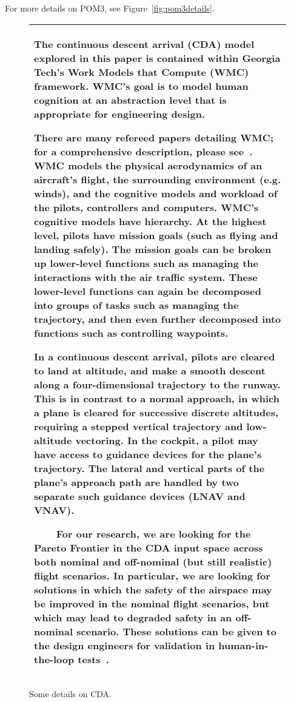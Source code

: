 \documentclass[10pt,journal,compsoc]{IEEEtran}
\newcommand{\fig}[1]{Figure~\ref{fig:#1}}
\begin{document}
For more details on POM3, see \fig{pom3details}.

\begin{figure}[!b]
\begin{center}\small
\begin{tabular}{|p{.95\linewidth}|}\hline
The continuous descent arrival (CDA) model explored in this paper is contained within Georgia Tech's Work Models that Compute (WMC) framework.
WMC's goal is to model human cognition at an abstraction level that is appropriate for engineering design.

There are many refereed papers detailing WMC; for a comprehensive description, please see~\cite{Kim2011,Pritchett2011,Feigh2012,Pritchett2013}.
WMC models the physical aerodynamics of an aircraft's flight, the surrounding environment (e.g. winds), and the cognitive models and workload of the pilots, controllers and computers.
WMC's cognitive models have hierarchy.
At the highest level, pilots have mission goals (such as flying and landing safely).
The mission goals can be broken up lower-level functions such as managing the interactions with the air traffic system.
These lower-level functions can again be decomposed into groups of tasks such as managing the trajectory, and then even further decomposed into functions such as controlling waypoints.

In a continuous descent arrival, pilots are cleared to land at altitude, and make a smooth descent along a four-dimensional trajectory to the runway.  
This is in contrast to a normal approach, in which a plane is cleared for successive discrete altitudes, requiring a stepped vertical trajectory and low-altitude vectoring.  
In the cockpit, a pilot may have access to guidance devices for the plane's trajectory.  
The lateral and vertical parts of the plane's approach path are handled by two separate such guidance devices (LNAV and VNAV).

~~~~For our research, we are looking for the Pareto Frontier in the CDA input space across both nominal and off-nominal (but still realistic) flight scenarios.
In particular, we are looking for solutions in which the safety of the airspace may be improved in the nominal flight scenarios, but which may lead to degraded safety in an off-nominal scenario.
These solutions can be given to the design engineers for validation in human-in-the-loop tests~\cite{Kim2013}.\\\hline
\end{tabular}
\end{center}
\caption{Some details on CDA.}\label{fig:cdaDetails}
\end{figure}
\end{document}
